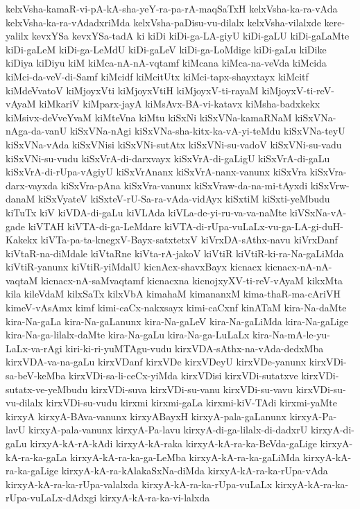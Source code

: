 {kelxVsha-kamaR-vi-pA-kA-sha-yeY-ra-pa-rA-maqSaTxH
kelxVsha-ka-ra-vAda
kelxVsha-ka-ra-vAdadxriMda
kelxVsha-paDisu-vu-dilalx
kelxVsha-vilalxde
kere-yalilx
kevxYSa
kevxYSa-tadA
ki
kiDi
kiDi-ga-LA-giyU
kiDi-gaLU
kiDi-gaLaMte
kiDi-gaLeM
kiDi-ga-LeMdU
kiDi-gaLeV
kiDi-ga-LoMdige
kiDi-gaLu
kiDike
kiDiya
kiDiyu
kiM
kiMca-nA-nA-vqtamf
kiMcana
kiMca-na-veVda
kiMcida
kiMci-da-veV-di-Samf
kiMcidf
kiMcitUtx
kiMci-tapx-shayxtayx
kiMcitf
kiMdeVvatoV
kiMjoyxVti
kiMjoyxVtiH
kiMjoyxV-ti-rayaM
kiMjoyxV-ti-reV-vAyaM
kiMkariV
kiMparx-jayA
kiMsAvx-BA-vi-katavx
kiMsha-badxkekx
kiMsivx-deVveYvaM
kiMteVna
kiMtu
kiSxNi
kiSxVNa-kamaRNaM
kiSxVNa-nAga-da-vanU
kiSxVNa-nAgi
kiSxVNa-sha-kitx-ka-vA-yi-teMdu
kiSxVNa-teyU
kiSxVNa-vAda
kiSxVNisi
kiSxVNi-sutAtx
kiSxVNi-su-vadoV
kiSxVNi-su-vadu
kiSxVNi-su-vudu
kiSxVrA-di-darxvayx
kiSxVrA-di-gaLigU
kiSxVrA-di-gaLu
kiSxVrA-di-rUpa-vAgiyU
kiSxVrAnanx
kiSxVrA-nanx-vanunx
kiSxVra
kiSxVra-darx-vayxda
kiSxVra-pAna
kiSxVra-vanunx
kiSxVraw-da-na-mi-tAyxdi
kiSxVrw-danaM
kiSxVyateV
kiSxteV-rU-Sa-ra-vAda-vidAyx
kiSxtiM
kiSxti-yeMbudu
kiTuTx
kiV
kiVDA-di-gaLu
kiVLAda
kiVLa-de-yi-ru-va-va-naMte
kiVSxNa-vA-gade
kiVTAH
kiVTA-di-ga-LeMdare
kiVTA-di-rUpa-vuLaLx-vu-ga-LA-gi-duH-Kakekx
kiVTa-pa-ta-knegxV-Bayx-satxtetxV
kiVrxDA-sAthx-navu
kiVrxDanf
kiVtaR-na-diMdale
kiVtaRne
kiVta-rA-jakoV
kiVtiR
kiVtiR-ki-ra-Na-gaLiMda
kiVtiR-yanunx
kiVtiR-yiMdalU
kicnAcx-shavxBayx
kicnacx
kicnacx-nA-nA-vaqtaM
kicnacx-nA-saMvaqtamf
kicnacxna
kicnojxyXV-ti-reV-vAyaM
kikxMta
kila
kileVdaM
kilxSaTx
kilxVbA
kimahaM
kimananxM
kima-thaR-ma-cAriVH
kimeV-vAsAmx
kimf
kimi-caCx-nakxsayx
kimi-caCxnf
kinATaM
kira-Na-daMte
kira-Na-gaLa
kira-Na-gaLanunx
kira-Na-gaLeV
kira-Na-gaLiMda
kira-Na-gaLige
kira-Na-ga-lilalx-daMte
kira-Na-gaLu
kira-Na-ga-LuLaLx
kira-Na-mA-le-yu-LaLx-va-rAgi
kiri-ki-ri-yuMTAgu-vudu
kirxVDA-sAthx-na-vAda-dedxMba
kirxVDA-va-na-gaLu
kirxVDanf
kirxVDe
kirxVDeyU
kirxVDe-yanunx
kirxVDi-sa-beV-keMba
kirxVDi-sa-li-ceCx-yiMda
kirxVDisi
kirxVDi-sutatxve
kirxVDi-sutatx-ve-yeMbudu
kirxVDi-suva
kirxVDi-su-vanu
kirxVDi-su-vavu
kirxVDi-su-vu-dilalx
kirxVDi-su-vudu
kirxmi
kirxmi-gaLa
kirxmi-kiV-TAdi
kirxmi-yaMte
kirxyA
kirxyA-BAva-vanunx
kirxyABayxH
kirxyA-pala-gaLanunx
kirxyA-Pa-lavU
kirxyA-pala-vanunx
kirxyA-Pa-lavu
kirxyA-di-ga-lilalx-di-dadxrU
kirxyA-di-gaLu
kirxyA-kA-rA-kAdi
kirxyA-kA-raka
kirxyA-kA-ra-ka-BeVda-gaLige
kirxyA-kA-ra-ka-gaLa
kirxyA-kA-ra-ka-ga-LeMba
kirxyA-kA-ra-ka-gaLiMda
kirxyA-kA-ra-ka-gaLige
kirxyA-kA-ra-kAlakaSxNa-diMda
kirxyA-kA-ra-ka-rUpa-vAda
kirxyA-kA-ra-ka-rUpa-valalxda
kirxyA-kA-ra-ka-rUpa-vuLaLx
kirxyA-kA-ra-ka-rUpa-vuLaLx-dAdxgi
kirxyA-kA-ra-ka-vi-lalxda
}
